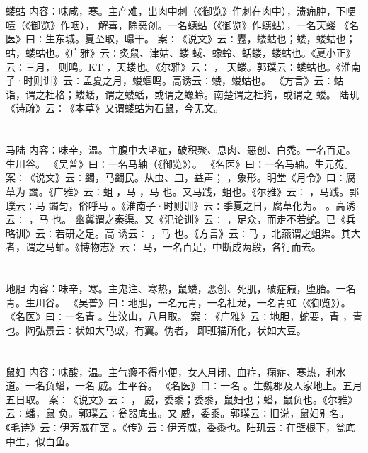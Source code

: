 \documentclass[12pt,UTF8]{ctexbook}
\begin{document}
\section{}蝼蛄
内容：味咸，寒。主产难，出肉中刺（《御览》作刺在肉中），溃痈肿，下哽噎（《御览》作咽）， 
解毒，除恶创。一名蟪蛄（《御览》作蟪蛄），一名天蝼 
《名医》曰∶生东城。夏至取，曝干。 
案∶《说文》云∶蠹，蝼蛄也；蝼，蝼蛄也；蛄，蝼蛄也。《广雅》云∶炙鼠、津姑、蝼 
蜮、蟓蛉、蛞蝼，蝼蛄也。《夏小正》云∶三月， 则鸣。KT ，天蝼也。《尔雅》云∶ ， 
天蝼。郭璞云∶蝼蛄也。《淮南子·时则训》云∶孟夏之月，蝼蝈鸣。高诱云∶蝼，蝼蛄也。 
《方言》云∶蛄诣，谓之杜格；蝼蛞，谓之蝼蛞，或谓之蟓蛉。南楚谓之杜狗，或谓之 蝼。 
陆玑《诗疏》云∶《本草》又谓蝼蛄为石鼠，今无文。 


\section{}马陆
内容：味辛，温。主腹中大坚症，破积聚、息肉、恶创、白秃。一名百足。生川谷。 
《吴普》曰∶一名马轴（《御览》）。 
《名医》曰∶一名马轴。生元菟。 
案∶《说文》云∶蠲，马蠲民。从虫、皿，益声； ，象形。明堂《月令》曰∶腐草为 
蠲。《广雅》云∶蛆 ，马 ，马 也。又马践，蛆也。《尔雅》云∶ ，马践。郭璞云∶马 
蠲匀，俗呼马 。《淮南子·时则训》云∶季夏之日，腐草化为。 。高诱云∶ ，马 也。 
幽冀谓之秦渠。又《汜论训》云∶ ，足众，而走不若蛇。已《兵略训》云∶若研之足。高 
诱云∶ ，马 也。《方言》云∶马 ，北燕谓之蛆渠。其大者，谓之马蚰。《博物志》云∶ 
马，一名百足，中断成两段，各行而去。 


\section{}地胆
内容：味辛，寒。主鬼注、寒热，鼠蝼，恶创、死肌，破症瘕，堕胎。一名 青。生川谷。 
《吴普》曰∶地胆，一名元青，一名杜龙，一名青虹（《御览》）。 
《名医》曰∶一名青 。生汶山，八月取。 
案∶《广雅》云∶地胆，蛇要，青 ，青 也。陶弘景云∶状如大马蚁，有翼。伪者， 
即班猫所化，状如大豆。 


\section{}鼠妇
内容：味酸，温。主气癃不得小便，女人月闭、血症，痫症、寒热，利水道。一名负蟠，一名 
威。生平谷。 
《名医》曰∶一名 。生魏郡及人家地上。五月五日取。 
案∶《说文》云∶ ， 威，委黍；委黍，鼠妇也；蟠，鼠负也。《尔雅》云∶蟠，鼠 
负。郭璞云∶瓮器底虫。又 威，委黍。郭璞云∶旧说，鼠妇别名。《毛诗》云∶伊芳威在室 
。《传》云∶伊芳威，委黍也。陆玑云∶在壁根下，瓮底中生，似白鱼。 
\end{document}
